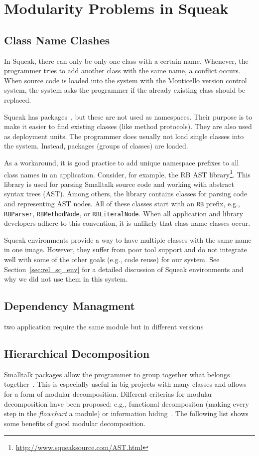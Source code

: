 \chapter{Modularity Problems in Squeak}
\label{sec:problem}

\section{Class Name Clashes}
In Squeak, there can only be only one class with a certain name. Whenever, the programmer tries to add another class with the same name, a conflict occurs. When source code is loaded into the system with the Monticello version control system, the system asks the programmer if the already existing class should be replaced.

Squeak has packages~\cite{Nierstrasz:2009:SE:1816759}, but these are not used as namespaces. Their purpose is to make it easier to find existing classes (like method protocols). They are also used as deployment units. The programmer does usually not load single classes into the system. Instead, packages (groups of classes) are loaded.

As a workaround, it is good practice to add unique namespace prefixes to all class names in an application. Consider, for example, the RB AST library\footnote{\url{http://www.squeaksource.com/AST.html}}. This library is used for parsing Smalltalk source code and working with abstract syntax trees (AST). Among others, the library contains classes for parsing code and representing AST nodes. All of these classes start with an \texttt{RB} prefix, e.g., \texttt{RBParser}, \texttt{RBMethodNode}, or \texttt{RBLiteralNode}. When all application and library developers adhere to this convention, it is unlikely that class name classes occur.

Squeak environments provide a way to have multiple classes with the same name in one image. However, they suffer from poor tool support and do not integrate well with some of the other goals (e.g., code reuse) for our system. See Section~\ref{sec:rel_sq_env} for a detailed discussion of Squeak environments and why we did not use them in this system.

\section{Dependency Managment}
two application require the same module but in different versions

\section{Hierarchical Decomposition}
Smalltalk packages allow the programmer to group together what belongs together~\cite{Eckel:2002:TJ:579108}. This is especially useful in big projects with many classes and allows for a form of modular decomposition. Different criterias for modular decomposition have been proposed: e.g., functional decompositon (making every step in the \emph{flowchart} a module) or information hiding~\cite{Parnas:1972:CUD:361598.361623}. The following list shows some benefits of good modular decomposition.

